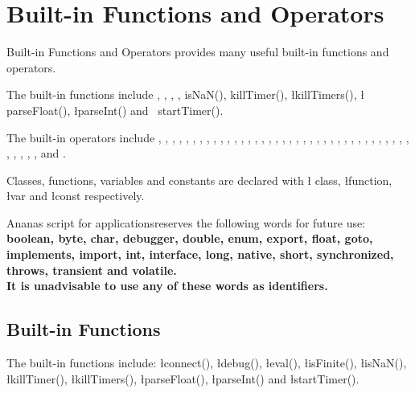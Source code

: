 \documentclass[11pt,a4paper]{book}
\newcommand{\AS}{Ananas script for applications}
\newcommand{\BR}{\\}
\begin{document}
{{\section{Built-in Functions and Operators}

Built-in Functions and Operators provides many useful
built-in functions and operators.

The built-in functions include , , ,
, \index isNaN(), \index killTimer(), \l killTimers(), \l
parseFloat(), \l parseInt() and \ startTimer().

The built-in operators include , , , , , , , , , , , , , , , , , , , , , , , , , , , , , , , , , , , , , , , ,
, ,  and
.

Classes, functions, variables and constants are declared with \l
class, \l function, \l var and \l const respectively.

\AS reserves the following words for future use: \\
\bf boolean, \bf byte, \bf char, \bf debugger, \bf double, \bf enum,
\bf export, \bf float, \bf goto, \bf implements, \bf import,
\bf int, \bf interface, \bf long, \bf native, \bf short,
\bf synchronized, \bf throws, \bf transient and \bf volatile.\BR
It is unadvisable to use any of these words as identifiers.

\subsection{Built-in Functions}

The built-in functions include: \l connect(), \l debug(),
\l eval(), \l isFinite(), \l isNaN(), \l killTimer(), \l killTimers(),
\l parseFloat(), \l parseInt() and \l startTimer().

}}
\end{document}
